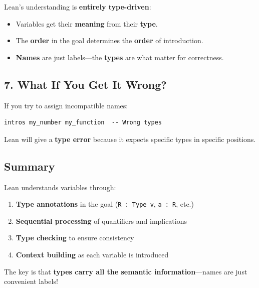 \documentclass{amsart}
\theoremstyle{plain}
\theoremstyle{definition}
\theoremstyle{remark}
\begin{document}
Lean's understanding is \textbf{entirely type-driven}:

\begin{itemize}
	\item Variables get their \textbf{meaning} from their \textbf{type}.
	\item The \textbf{order} in the goal determines the \textbf{order} of introduction.
	\item \textbf{Names} are just labels—the \textbf{types} are what matter for correctness.
\end{itemize}


\subsection{\textbf{7. What If You Get It Wrong?}}

If you try to assign incompatible names:

\begin{lstlisting}[language=lean]
intros my_number my_function  -- Wrong types
\end{lstlisting}
Lean will give a \textbf{type error} because it expects specific types in specific positions.


\subsection{\textbf{Summary}}

Lean understands variables through:

\begin{enumerate}
	\item \textbf{Type annotations} in the goal (\lstinline{R : Type v}, \lstinline{a : R}, etc.)
	\item \textbf{Sequential processing} of quantifiers and implications
	\item \textbf{Type checking} to ensure consistency
	\item \textbf{Context building} as each variable is introduced
\end{enumerate}

The key is that \textbf{types carry all the semantic information}—names are just convenient labels!
\end{document}
